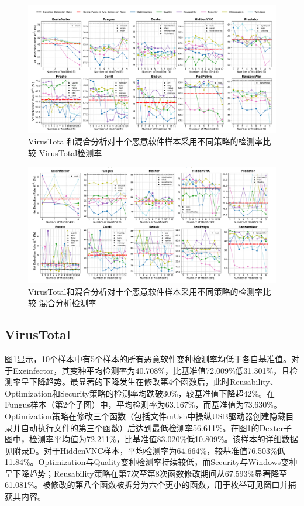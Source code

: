 \begin{figure}[htb]
	\centering
	\includegraphics[width=1.15\textwidth]{figures/figure2_a.png}
	\caption{VirusTotal和混合分析对十个恶意软件样本采用不同策略的检测率比较-VirusTotal检测率}
	\label{fig:5.1}
\end{figure}
\begin{figure}[htb]
	\centering
	\includegraphics[width=1.15\textwidth]{figures/figure2_b.png}
	\caption{VirusTotal和混合分析对十个恶意软件样本采用不同策略的检测率比较-混合分析检测率}
	\label{fig:5.2}
\end{figure}

\subsection{VirusTotal}
图\ref{fig:5.1}显示，10个样本中有5个样本的所有恶意软件变种检测率均低于各自基准值。对于Exeinfector，其变种平均检测率为40.708\%，比基准值72.009\%低31.301\%，且检测率呈下降趋势。最显著的下降发生在修改第4个函数后，此时Reusability、Optimization和Security策略的检测率均跌破30\%，较基准值下降超42\%。在Fungus样本（第2个子图）中，平均检测率为63.167\%，而基准值为73.630\%。Optimization策略在修改三个函数（包括文件mUsb中操纵USB驱动器创建隐藏目录并自动执行文件的第三个函数）后达到最低检测率56.611\%。在图\ref{fig:5.1}的Dexter子图中，检测率平均值为72.211\%，比基准值83.020\%低10.809\%。该样本的详细数据见附录D。对于HiddenVNC样本，平均检测率为64.664\%，较基准值76.503\%低11.84\%。Optimization与Quality变种检测率持续较低，而Security与Windows变种呈下降趋势；Reusability策略在第7次至第8次函数修改期间从67.593\%显著降至61.081\%。被修改的第八个函数被拆分为六个更小的函数，用于枚举可见窗口并捕获其内容。

